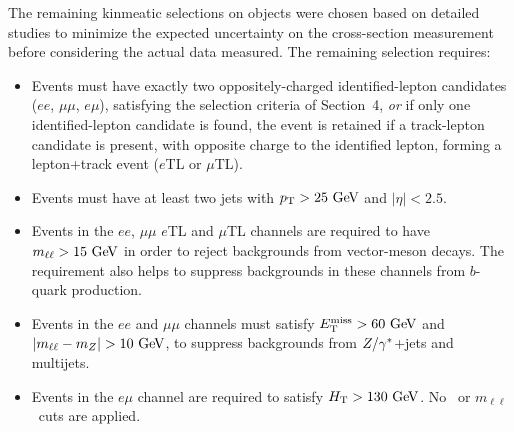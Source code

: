 The remaining kinmeatic selections on objects were chosen based on detailed studies
to minimize the expected uncertainty on the cross-section measurement before
considering the actual data measured.
The remaining selection requires:


\begin{itemize}

\item Events must have exactly two oppositely-charged identified-lepton candidates ($ee$, $\mu\mu$,
  $e\mu$), satisfying the selection criteria of Section~4, {\em or} if only one identified-lepton candidate is found, the event is retained if a track-lepton candidate is present, with opposite charge to the identified lepton, forming a lepton+track event ($e$TL or $\mu$TL).

\item Events must have at least two jets with $\pT>25\GeV$ and $|\eta|<2.5$.%

\item Events in the $ee$, $\mu\mu$ $e$TL and $\mu$TL channels are required to have $m_{\ell\ell} > 15\GeV$ in order to
reject backgrounds from vector-meson decays. The requirement also helps to suppress backgrounds in these channels from $b$-quark production.

\item Events in the $ee$ and $\mu\mu$ channels must satisfy $\MET>60\GeV$ and $|m_{\ell\ell} - m_Z| > 10\GeV$,
to suppress backgrounds from $Z/\gamma^{*}$+jets and multijets.

\item
Events in the $e\mu$ channel are required to satisfy $\HT>130\GeV$. No \MET\ or $m_{\ell\ell}$\ cuts are applied.

\end{itemize}


